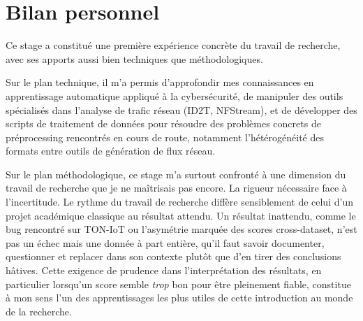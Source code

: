 \documentclass[12pt, a4paper]{report}
\begin{document}
\section{Bilan personnel}
 
Ce stage a constitué une première expérience concrète du travail de
recherche, avec ses apports aussi bien techniques que méthodologiques.
 
Sur le plan technique, il m'a permis d'approfondir mes connaissances en
apprentissage automatique appliqué à la cybersécurité, de manipuler des
outils spécialisés dans l'analyse de trafic réseau (ID2T, NFStream), et
de développer des scripts de traitement de données pour résoudre des
problèmes concrets de préprocessing rencontrés en cours de route,
notamment l'hétérogénéité des formats entre outils de génération de
flux réseau.
 
Sur le plan méthodologique, ce stage m'a surtout confronté à une
dimension du travail de recherche que je ne maîtrisais pas encore.
La rigueur nécessaire face à l'incertitude. Le rythme du travail de
recherche diffère sensiblement de celui d'un projet académique classique
au résultat attendu. Un résultat inattendu, comme le bug rencontré sur
TON-IoT ou l'asymétrie marquée des scores cross-dataset, n'est pas un
échec mais une donnée à part entière, qu'il faut savoir documenter,
questionner et replacer dans son contexte plutôt que d'en tirer des
conclusions hâtives. Cette exigence de prudence dans l'interprétation
des résultats, en particulier lorsqu'un score semble \textit{trop} bon
pour être pleinement fiable, constitue à mon sens l'un des apprentissages
les plus utiles de cette introduction au monde de la recherche.
 
 
\printbibliography[heading=bibintoc, title={Références bibliographiques}]
 
 
\end{document}
